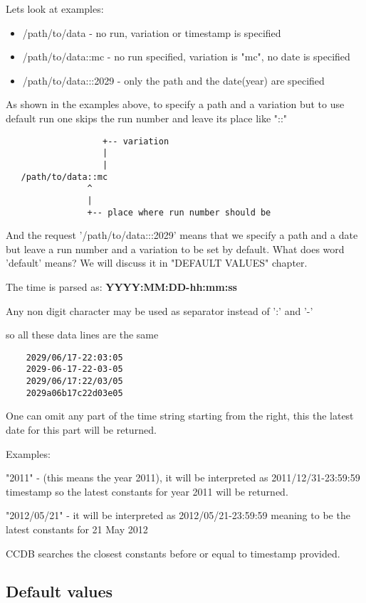 \documentclass{article}
\begin{document}
Lets look at examples:
\begin{itemize}
\item /path/to/data - no run, variation or timestamp is specified
\item /path/to/data::mc - no run specified, variation is "mc", no date is specified
\item /path/to/data:::2029 - only the path and the date(year) are specified
\end{itemize}

As shown in the examples above, to specify a path and a variation but 
to use default run one skips the run number and leave its place like "::"
\begin{verbatim}
                   +-- variation
                   |
                   |
   /path/to/data::mc
                ^
                |
                +-- place where run number should be
\end{verbatim}


And the request '/path/to/data:::2029' means that we specify a path and a date
but leave a run number and a variation to be set by default.
What does word 'default' means? We will discuss it in "DEFAULT VALUES" chapter.

The time is parsed as:
    \textbf{YYYY:MM:DD-hh:mm:ss}

Any non digit character may be used as separator instead of ':' and '-'

so all these data lines are the same
\begin{verbatim}
    2029/06/17-22:03:05
    2029-06-17-22-03-05
    2029/06/17:22/03/05
    2029a06b17c22d03e05
\end{verbatim}

One can omit any part of the time string starting from the right, this the latest date for this
part will be returned.

Examples:

"2011" - (this means the year 2011), it will be interpreted as 
2011/12/31-23:59:59 timestamp so the latest constants for year 
2011 will be returned.


"2012/05/21" - it will be interpreted as 2012/05/21-23:59:59 meaning to be the latest
constants for 21 May 2012

CCDB searches the closest constants before or equal to timestamp provided.


\subsection{Default values}
\end{document}
